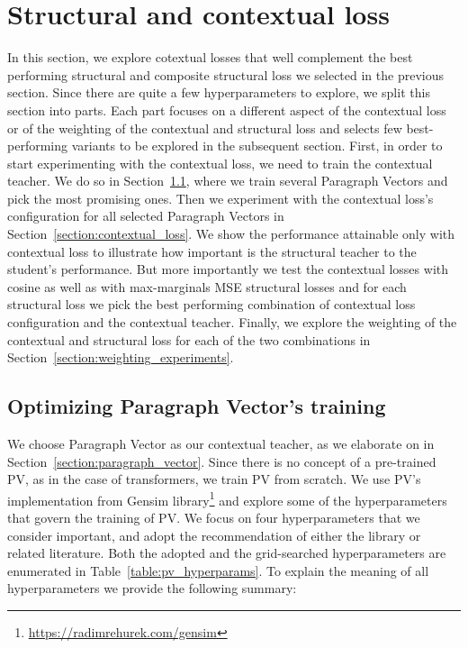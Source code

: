 \section{Structural and contextual loss}\label{section:structural_and_contextual}

In this section, we explore cotextual losses that well complement the best
performing structural and composite structural loss we selected in the previous
section. Since there are quite a few hyperparameters to explore, we split this
section into parts. Each part focuses on a different aspect of the contextual
loss or of the weighting of the contextual and structural loss and selects few
best-performing variants to be explored in the subsequent section. First, in
order to start experimenting with the contextual loss, we need to train the
contextual teacher. We do so in Section~\ref{section:pv_training}, where we
train several Paragraph Vectors and pick the most promising ones. Then we
experiment with the contextual loss's configuration for all selected Paragraph
Vectors in Section~\ref{section:contextual_loss}. We show the performance
attainable only with contextual loss to illustrate how important is the
structural teacher to the student's performance. But more importantly we test
the contextual losses with cosine as well as with max-marginals MSE structural
losses and for each structural loss we pick the best performing combination of
contextual loss configuration and the contextual teacher. Finally, we explore
the weighting of the contextual and structural loss for each of the two
combinations in Section~\ref{section:weighting_experiments}.

\subsection{Optimizing Paragraph Vector's training}\label{section:pv_training}

We choose Paragraph Vector \citep{le2014distributed} as our contextual teacher,
as we elaborate on in Section~\ref{section:paragraph_vector}. Since there is no
concept of a pre-trained PV, as in the case of transformers, we train PV from
scratch. We use PV's implementation from Gensim
library\footnote{\label{fn:link_to_gensim}\url{https://radimrehurek.com/gensim}}
and explore some of the hyperparameters that govern the training of PV. We
focus on four hyperparameters that we consider important, and adopt the
recommendation of either the library or related literature. Both the adopted
and the grid-searched hyperparameters are enumerated in
Table~\ref{table:pv_hyperparams}. To explain the meaning of all hyperparameters
we provide the following summary:


